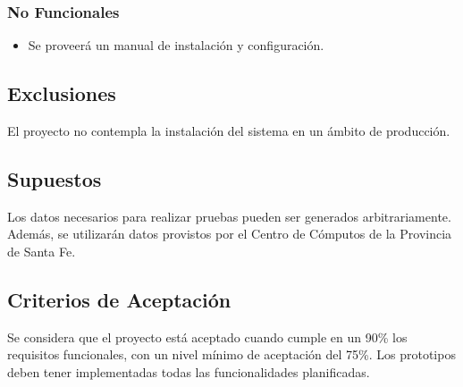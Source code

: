 \subsubsection*{No Funcionales}
\begin{itemize}
	\item Se proveerá un manual de instalación y configuración.
\end{itemize}
 
\subsection*{Exclusiones}
El proyecto no contempla la instalación del sistema en un ámbito de producción.

\subsection*{Supuestos}
Los datos necesarios para realizar pruebas pueden ser generados arbitrariamente. Además, se utilizarán datos provistos por el Centro de Cómputos de la Provincia de Santa Fe.

\subsection*{Criterios de Aceptación}
Se considera que el proyecto está aceptado cuando cumple en un 90\% los requisitos funcionales, con un nivel mínimo de aceptación del 75\%. Los prototipos deben tener implementadas todas las funcionalidades planificadas.